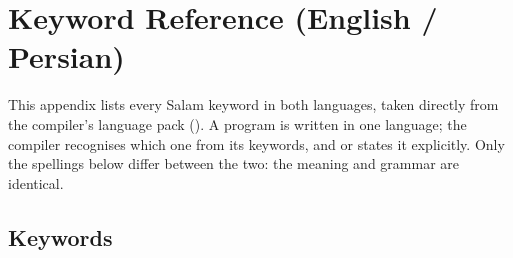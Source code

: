 \chapter{Keyword Reference (English / Persian)}%
\label{app:keywords}
\pagestyle{keywordsappendix}

This appendix lists every Salam keyword in both languages, taken directly from the
compiler's language pack (). A program is written
in one language; the compiler recognises which one from its keywords, and
 or  states it explicitly. Only the spellings
below differ between the two: the meaning and grammar are identical.

\section*{Keywords}

